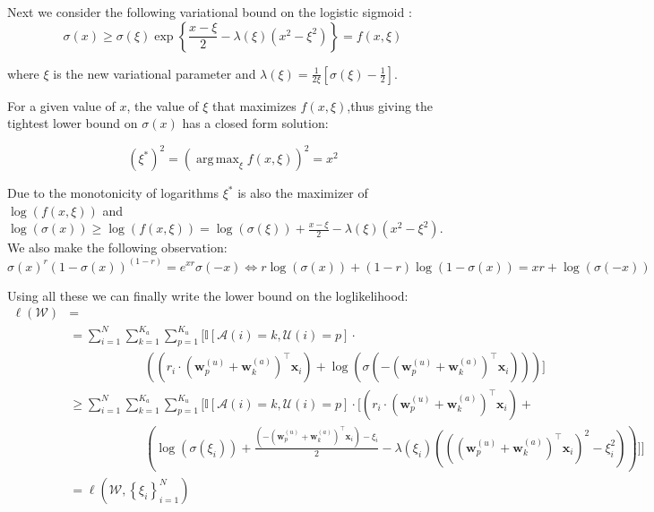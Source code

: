 \documentclass[11pt, a4paper]{article}
\DeclareMathOperator*{\argmax}{arg\,max}
\begin{document}
\noindent Next we consider the following variational bound on the logistic sigmoid : $$\sigma(x)\geq \sigma(\xi)\exp\left\{\frac{x-\xi}{2}-\lambda(\xi)\left(x^2-\xi^2\right)\right\}=f(x,\xi)$$

\noindent where $\xi$ is the new variational parameter and $\lambda(\xi)=\frac{1}{2\xi}\left[\sigma(\xi)-\frac{1}{2}\right]$.

\noindent For a given value of $x$, the value of $\xi$ that maximizes $f(x,\xi)$,thus giving the tightest lower bound on $\sigma(x)$ has a closed form solution:

$$\left(\xi^*\right)^2=\left(\argmax_\xi f(x,\xi)\right)^2= x^2$$

\noindent Due to the monotonicity of logarithms $\xi^*$ is also the maximizer of $\log\left( f(x,\xi)\right)$ and $\log\left(\sigma(x)\right)\geq \log\left( f(x,\xi)\right)= \log\left(\sigma(\xi)\right)+\frac{x-\xi}{2}-\lambda(\xi)\left(x^2-\xi^2\right)$. We also make the following observation:
$$\sigma(x)^r\left(1-\sigma(x)\right)^{\left(1-r\right)}=e^{xr}\sigma(-x)\Leftrightarrow  r\log\left(\sigma(x)\right)+\left(1-r\right)\log\left(1-\sigma(x)\right)=xr+\log\left(\sigma(-x)\right)$$

\noindent Using all these we can finally write the lower bound on the loglikelihood:
\begin{align*}
\ell(\mathcal{W})&=\\
&=\sum_{i=1}^N \sum_{k=1}^{K_a}\sum_{p=1}^{K_u} \bigg[\mathbb{I}\left[\mathcal{A}(i)=k,\mathcal{U}(i)=p\right]\cdot\\
&\qquad{}\qquad{}\qquad{}\left(\left(r_i\cdot\left(\textbf{w}^{(u)}_{p} +\textbf{w}^{(a)}_{k}\right)^\top \textbf{x}_i\right) + \log\left(\sigma\left(-\left(\textbf{w}^{(u)}_{p} +\textbf{w}^{(a)}_{k}\right)^\top \textbf{x}_i\right)\right)\right)\bigg]\\
&\geq\sum_{i=1}^N \sum_{k=1}^{K_a}\sum_{p=1}^{K_u} \Bigg[\mathbb{I}\left[\mathcal{A}(i)=k,\mathcal{U}(i)=p\right]\cdot\bigg[\left(r_i\cdot\left(\textbf{w}^{(u)}_{p} +\textbf{w}^{(a)}_{k}\right)^\top \textbf{x}_i\right)+\\
&\qquad{}\qquad{}\qquad{}\left(\log\left(\sigma(\xi_i)\right)+\frac{\left(-\left(\textbf{w}^{(u)}_{p} +\textbf{w}^{(a)}_{k}\right)^\top \textbf{x}_i\right)-\xi_i}{2}-\lambda(\xi_i)\left(\left(\left(\textbf{w}^{(u)}_{p} +\textbf{w}^{(a)}_{k}\right)^\top \textbf{x}_i\right)^2-\xi_i^2\right)\right)\bigg]\Bigg]\\
&= \ell(\mathcal{W},\left\{\xi_i\right\}_{i=1}^N)\\
\end{align*}
\end{document}
